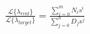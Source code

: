 \documentclass[convert={outext=.svg,density=750}]{standalone}
\begin{document}
$
    \frac{\mathcal{L}\{\lambda_{real}\}}{\mathcal{L}\{\lambda_{target}\}} =
    \frac{\sum_{i=0}^m N_is^i}{\sum_{j=0}^n D_js^j}
$
\end{document}

